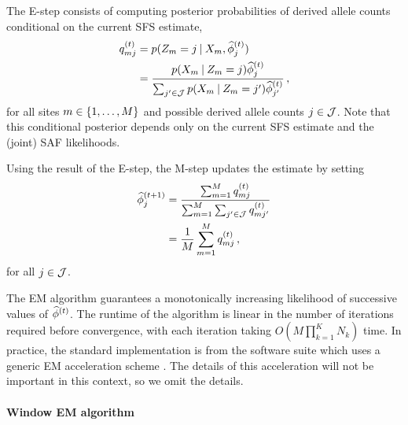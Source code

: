 The E-step consists of computing posterior probabilities of derived allele counts conditional on the current SFS estimate,
%
\begin{align}\label{eq:estep}
    \post[t]_{mj}
    &=
    \prob(\ct[m] = j \given \data[m], \estsfs[t]_j) \nonumber \\
    &= 
    \frac{
        \prob(\data[m] \given \ct[m] = j) \estsfs[t]_j
    }{
        \sum_{j' \in \ctset} \prob(\data[m] \given \ct[m] = j') \estsfs[t]_{j'}
    }
    \, ,
\end{align}
%
for all sites $m \in \{1, \dots, M\}$ and possible derived allele counts $j \in \mathcal{J}$.
Note that this conditional posterior depends only on the current SFS estimate and the (joint) SAF likelihoods.

Using the result of the E-step, the M-step updates the estimate by setting
%
\begin{align}\label{eq:mstep}
    \estsfs[t + 1]_j 
    &= 
    \frac{ 
        \sum_{m = 1}^{M} \post[t]_{mj}
    }{
        \sum_{m = 1}^{M} \sum_{j' \in \ctset} \post[t]_{mj'}
    } \nonumber \\
    &= 
    \frac{1}{M} \sum_{m = 1}^{M} \post[t]_{mj}
    \, ,
\end{align}
%
for all $j \in \mathcal{J}$. 

The EM algorithm guarantees a monotonically increasing likelihood of successive values of $\estsfs[t]$.
The runtime of the algorithm is linear in the number of iterations required before convergence, with each iteration taking $O(M\prod_{k = 1}^K N_k)$ time.
In practice, the standard implementation is \realsfs \cite{Nielsen2012} from the software suite \angsd \cite{Korneliussen2014} which uses a generic EM acceleration scheme \cite{Varadhan2008}.
The details of this acceleration will not be important in this context, so we omit the details.

\paragraph{Window EM algorithm}

